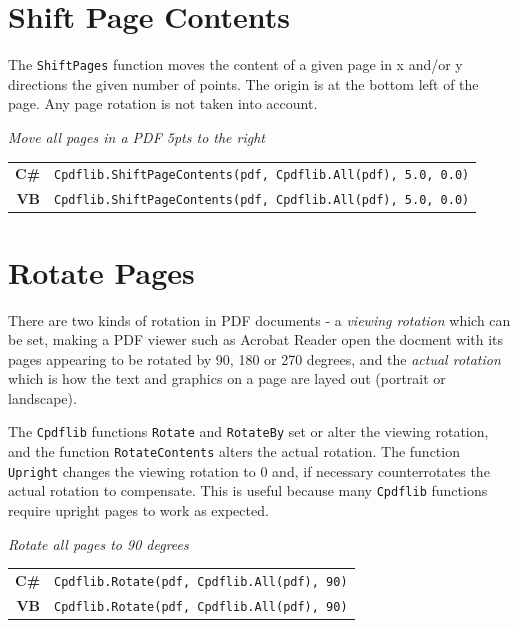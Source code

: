 \documentclass[a4paper]{memoir}
\begin{document}
\section{Shift Page Contents}
The \verb!ShiftPages! function moves the content of a given page in x and/or y directions the given number of points. The origin is at the bottom left of the page. Any page rotation is not taken into account.

\begin{framed}
\noindent\textit{Move all pages in a PDF 5pts to the right}

\vspace{2mm}
\noindent\begin{tabular}{rl}
\small\sffamily\textbf{C\#} &
\begin{minipage}{4in}
\small\verb!Cpdflib.ShiftPageContents(pdf, Cpdflib.All(pdf), 5.0, 0.0)!
\end{minipage}\\[5mm]
\small\sffamily\textbf{VB} &
\begin{minipage}{4in}
\small\verb!Cpdflib.ShiftPageContents(pdf, Cpdflib.All(pdf), 5.0, 0.0)!
\end{minipage}\\[5mm]
\end{tabular}
\end{framed}

\section{Rotate Pages}
\label{upright}
There are two kinds of rotation in PDF documents - a \textit{viewing rotation} which can be set, making a PDF viewer such as Acrobat Reader open the docment with its pages appearing to be rotated by 90, 180 or 270 degrees, and the \textit{actual rotation} which is how the text and graphics on a page are layed out (portrait or landscape).

The \verb!Cpdflib! functions \verb!Rotate! and \verb!RotateBy! set or alter the viewing rotation, and the function \verb!RotateContents! alters the actual rotation. The function \verb!Upright! changes the viewing rotation to 0 and, if necessary counterrotates the actual rotation to compensate. This is useful because many \verb!Cpdflib! functions require upright pages to work as expected.

\begin{framed}
\noindent\textit{Rotate all pages to 90 degrees}

\vspace{2mm}
\noindent\begin{tabular}{rl}
\small\sffamily\textbf{C\#} &
\begin{minipage}{4in}
\small\verb!Cpdflib.Rotate(pdf, Cpdflib.All(pdf), 90)!
\end{minipage}\\[5mm]
\small\sffamily\textbf{VB} &
\begin{minipage}{4in}
\small\verb!Cpdflib.Rotate(pdf, Cpdflib.All(pdf), 90)!
\end{minipage}\\[5mm]
\end{tabular}
\end{framed}
\end{document}
